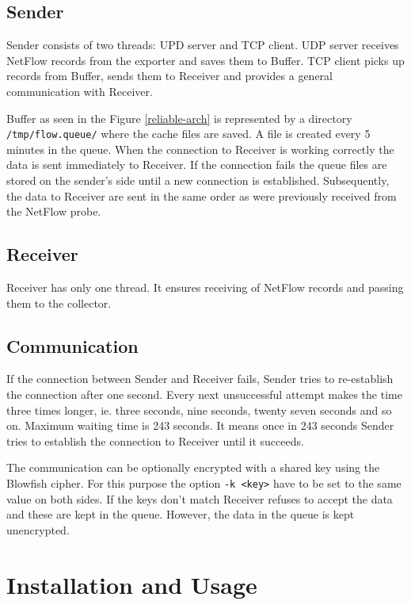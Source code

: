 \documentclass[11pt,a4paper]{article}
\begin{document}
\subsection{Sender}

Sender consists of two threads: UPD server and TCP client. UDP server receives NetFlow records from the exporter and saves them to Buffer. TCP client picks up records from Buffer, sends them to Receiver and provides a general communication with Receiver.

Buffer as seen in the Figure \ref{reliable-arch} is represented by a directory \texttt{/tmp/flow.queue/} where the cache files are saved. A file is created every 5 minutes in the queue. When the connection to Receiver is working correctly the data is sent immediately to Receiver. If the connection fails the queue files are stored on the sender's side until a new connection is established. Subsequently, the data to Receiver are sent in the same order as were previously received from the NetFlow probe.

\subsection{Receiver}

Receiver has only one thread. It ensures receiving of NetFlow records and passing them to the collector.

\subsection{Communication}

If the connection between Sender and Receiver fails, Sender tries to re-establish the connection after one second. Every next unsuccessful attempt makes the time three times longer, ie. three seconds, nine seconds, twenty seven seconds and so on. Maximum waiting time is 243 seconds. It means once in 243 seconds Sender tries to establish the connection to Receiver until it succeeds.

The communication can be optionally encrypted with a shared key using the Blowfish cipher. For this purpose the option \texttt{-k <key>} have to be set to the same value on both sides. If the keys don't match Receiver refuses to accept the data and these are kept in the queue. However, the data in the queue is kept unencrypted.

\section{Installation and Usage}
\end{document}
